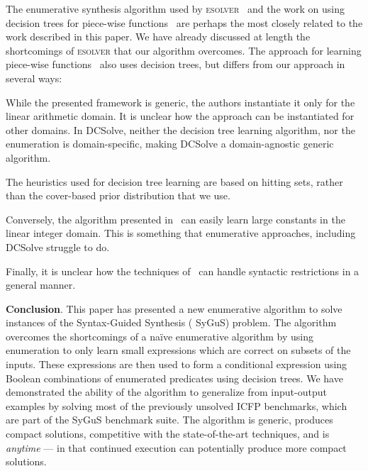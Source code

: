 \documentclass{llncs}
\newcommand{\sygus}{{\sffamily\fontsize{8.5}{10}\selectfont
    SyGuS}\xspace}
\newcommand{\dcsolve}{{\sffamily\fontsize{8.5}{10}\selectfont
    DCSolve}\xspace}
\renewcommand{\paragraph}[1]{\par\noindent\textbf{#1}.}
\newcommand{\esolver}{\textsc{esolver}\xspace}
\newcommand{\pwsolve}{{\sffamily\fontsize{8.5}{10}\selectfont
    PWSolve}\xspace}
\begin{document}
The enumerative synthesis algorithm used by
\esolver~\cite{udupa-transit, udupa-sygus} and the work on using decision
trees for piece-wise functions~\cite{madhusudan-16-pw} are perhaps the
most closely related to the work described in this paper.
We have already discussed at length the shortcomings of \esolver that our
algorithm overcomes.
The approach for learning piece-wise functions~\cite{madhusudan-16-pw}
also uses decision trees, but differs from our approach in several ways:
\begin{inparaenum}[(a)]
\item
  While the presented framework is generic, the authors instantiate it
  only for the linear arithmetic domain.
  It is unclear how the approach can be instantiated for other
  domains.
  In \dcsolve, neither the decision tree learning algorithm, nor the
  enumeration is domain-specific, making \dcsolve a domain-agnostic
  generic algorithm.
\item The heuristics used for decision tree learning are
based on hitting sets, rather than the cover-based prior distribution
that we use.
\item
  Conversely, the algorithm presented in~\cite{madhusudan-16-pw} can
  easily learn large constants in the linear integer domain.
  This is something that enumerative approaches, including \dcsolve
  struggle to do.
\item
  Finally, it is unclear how the techniques of~\cite{madhusudan-16-pw}
  can handle syntactic restrictions in a general manner.
\end{inparaenum}


\paragraph{Conclusion}
This paper has presented a new enumerative algorithm to solve
instances of the Syntax-Guided Synthesis (\sygus) problem. The
algorithm overcomes the shortcomings of a na\"ive enumerative
algorithm by using enumeration to only learn small expressions which
are correct on subsets of the inputs. These expressions are then used
to form a conditional expression using Boolean combinations of
enumerated predicates using decision trees. We have demonstrated the
ability of the algorithm to generalize from input-output examples by
solving most of the previously unsolved ICFP benchmarks, which are
part of the \sygus benchmark suite. The algorithm is generic, produces
compact solutions, competitive with the state-of-the-art techniques,
and is \emph{anytime} --- in that continued execution can potentially
produce more compact solutions.
\end{document}
